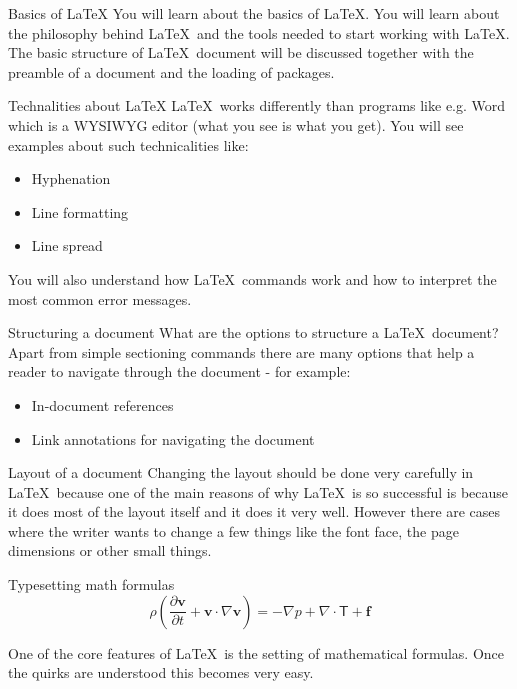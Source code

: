 \documentclass[10pt, a4paper]{beamer} %
\begin{document}
    \begin{frame}{Basics of \LaTeX}
        You will learn about the basics of \LaTeX. You will learn about the philosophy behind \LaTeX\ and the tools needed to start working with \LaTeX. The basic structure of \LaTeX\ document will be discussed together with the preamble of a document and the loading of packages.
    \end{frame}
    

    \begin{frame}{Technalities about \LaTeX}
    \LaTeX\ works differently than programs like e.g. Word which is a WYSIWYG editor (what you see is what you get). You will see examples about such technicalities like:

    \begin{itemize}
         \item Hyphenation
         \item Line formatting
         \item Line spread
     \end{itemize}

     You will also understand how \LaTeX\ commands work and how to interpret the most common error messages.
    \end{frame}

    \begin{frame}{Structuring a document}
    What are the options to structure a \LaTeX\ document? Apart from simple sectioning commands there are many options that help a reader to navigate through the document - for example:
    \begin{itemize}
         \item In-document references
         \item Link annotations for navigating the document
     \end{itemize}
    \end{frame}

    \begin{frame}{Layout of a document}
    Changing the layout should be done very carefully in \LaTeX\ because one of the main reasons of why \LaTeX\ is so successful is because it does most of the layout itself and it does it very well. However there are cases where the writer wants to change a few things like the font face, the page dimensions or other small things.
    \end{frame}

    \begin{frame}[t]{Typesetting math formulas}
    \vspace{1cm}
    \[ \rho\left( \frac{\partial \mathbf{v}}{\partial t} + \mathbf{v}\cdot\nabla\mathbf{v}\right) = -\nabla p + \nabla\cdot\mathsf{T}+\mathbf{f} \]

    \vspace*{\fill}
    One of the core features of \LaTeX\ is the setting of mathematical formulas. Once the quirks are understood this becomes very easy.
    \vspace*{\fill}
    \end{frame}
    
\end{document}
